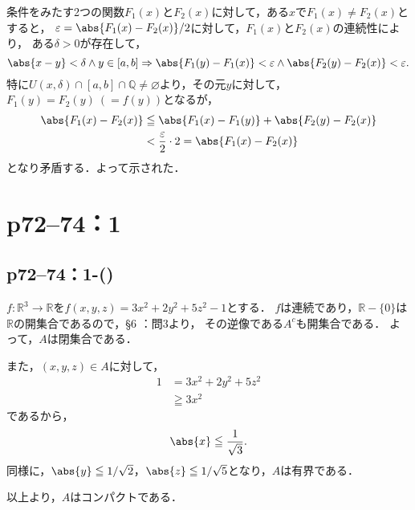 \begin{tproof}
    条件をみたす2つの関数$F_1 (x)$と$F_2(x)$に対して，ある$x$で$F_1(x) \ne F_2(x)$とすると，
    $\varepsilon = \abs{F_1(x) - F_2(x)}/2$に対して，$F_1(x)$と$F_2(x)$の連続性により，
    ある$\delta >0$が存在して，
    \[
        \abs{x-y}<\delta \land y \in [a,b] \Rightarrow \abs{F_1(y)-F_1(x)}<\varepsilon \land  \abs{F_2(y)-F_2(x)}<\varepsilon.
    \]
    特に$ U (x,\delta) \cap [a,b] \cap \mathbb{Q} \ne \varnothing$より，その元$y$に対して，
    $F_1 (y)=F_2(y)~(=f(y))$となるが，
    \begin{align*}
        \abs{F_1(x)-F_2(x)} & \leqq \abs{F_1(x)-F_1(y)} + \abs{F_2(y)-F_2(x)}          \\
                            & < \frac{\varepsilon}{2} \cdot 2  = \abs{F_1(x) - F_2(x)}
    \end{align*}
    となり矛盾する．よって示された．
\end{tproof}



\section*{p72--74：1}


\subsection*{p72--74：1-()}

\begin{tanswer}
    $ f\colon \mathbb{R}^3 \to \mathbb{R}$を$f(x,y,z)=3x^2 + 2y^2 + 5z^2 -1$とする．
    $f$は連続であり，$\mathbb{R} -\{ 0 \}$は$\mathbb{R}$の開集合であるので，\S 6 ：問3より，
    その逆像である$A^c$も開集合である．
    よって，$A$は閉集合である．

    また，$(x,y,z) \in A$に対して，
    \begin{align*}
        1 & = 3x^2 + 2y^2 + 5z^2 \\
          & \geqq 3x^2
    \end{align*}
    であるから，
    \[
        \abs{x} \leqq \frac{1}{\sqrt{3}}.
    \]
    同様に，$ \abs{y} \leqq 1/\sqrt{2}$，$\abs{z} \leqq 1/\sqrt{5}$となり，$A$は有界である．

    以上より，$A$はコンパクトである．
\end{tanswer}



